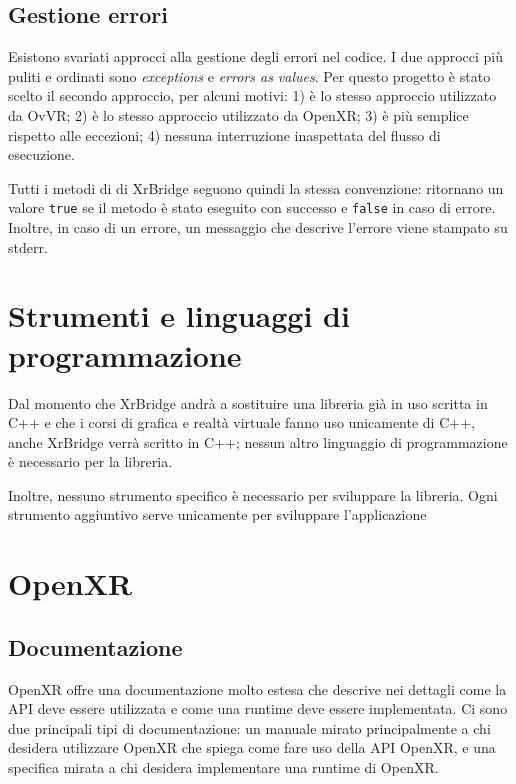 \documentclass[twoside]{supsistudent}
\begin{document}

\subsection{Gestione errori}

Esistono svariati approcci alla gestione degli errori nel codice. I due approcci più puliti e ordinati sono \textit{exceptions} e \textit{errors as values}. Per questo progetto è stato scelto il secondo approccio, per alcuni motivi: 1) è lo stesso approccio utilizzato da OvVR; 2) è lo stesso approccio utilizzato da OpenXR; 3) è più semplice rispetto alle eccezioni; 4) nessuna interruzione inaspettata del flusso di esecuzione.

Tutti i metodi di di XrBridge seguono quindi la stessa convenzione: ritornano un valore \texttt{true} se il metodo è stato eseguito con successo e \texttt{false} in caso di errore. Inoltre, in caso di un errore, un messaggio che descrive l'errore viene stampato su stderr.

\section{Strumenti e linguaggi di programmazione}

Dal momento che XrBridge andrà a sostituire una libreria già in uso scritta in C++ e che i corsi di grafica e realtà virtuale fanno uso unicamente di C++, anche XrBridge verrà scritto in C++; nessun altro linguaggio di programmazione è necessario per la libreria.

Inoltre, nessuno strumento specifico è necessario per sviluppare la libreria. Ogni strumento aggiuntivo serve unicamente per sviluppare l'applicazione


\section{OpenXR}

\subsection{Documentazione}

OpenXR offre una documentazione molto estesa che descrive nei dettagli come la API deve essere utilizzata e come una runtime deve essere implementata. Ci sono due principali tipi di documentazione: un manuale mirato principalmente a chi desidera utilizzare OpenXR che spiega come fare uso della API OpenXR, e una specifica mirata a chi desidera implementare una runtime di OpenXR.
\end{document}

